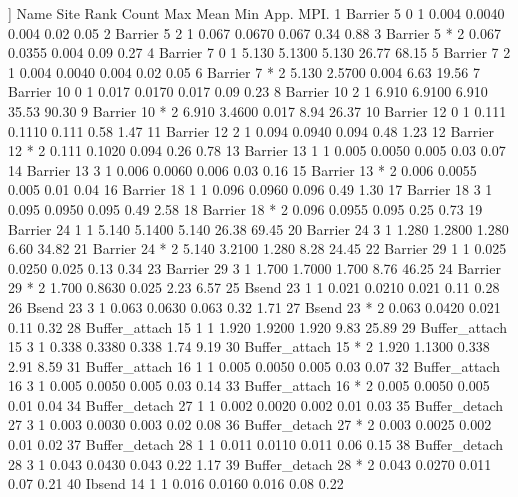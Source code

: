 \begin{Output}
[[5]]
            Name Site Rank Count   Max   Mean   Min  App.  MPI.
1        Barrier    5    0     1 0.004 0.0040 0.004  0.02  0.05
2        Barrier    5    2     1 0.067 0.0670 0.067  0.34  0.88
3        Barrier    5    *     2 0.067 0.0355 0.004  0.09  0.27
4        Barrier    7    0     1 5.130 5.1300 5.130 26.77 68.15
5        Barrier    7    2     1 0.004 0.0040 0.004  0.02  0.05
6        Barrier    7    *     2 5.130 2.5700 0.004  6.63 19.56
7        Barrier   10    0     1 0.017 0.0170 0.017  0.09  0.23
8        Barrier   10    2     1 6.910 6.9100 6.910 35.53 90.30
9        Barrier   10    *     2 6.910 3.4600 0.017  8.94 26.37
10       Barrier   12    0     1 0.111 0.1110 0.111  0.58  1.47
11       Barrier   12    2     1 0.094 0.0940 0.094  0.48  1.23
12       Barrier   12    *     2 0.111 0.1020 0.094  0.26  0.78
13       Barrier   13    1     1 0.005 0.0050 0.005  0.03  0.07
14       Barrier   13    3     1 0.006 0.0060 0.006  0.03  0.16
15       Barrier   13    *     2 0.006 0.0055 0.005  0.01  0.04
16       Barrier   18    1     1 0.096 0.0960 0.096  0.49  1.30
17       Barrier   18    3     1 0.095 0.0950 0.095  0.49  2.58
18       Barrier   18    *     2 0.096 0.0955 0.095  0.25  0.73
19       Barrier   24    1     1 5.140 5.1400 5.140 26.38 69.45
20       Barrier   24    3     1 1.280 1.2800 1.280  6.60 34.82
21       Barrier   24    *     2 5.140 3.2100 1.280  8.28 24.45
22       Barrier   29    1     1 0.025 0.0250 0.025  0.13  0.34
23       Barrier   29    3     1 1.700 1.7000 1.700  8.76 46.25
24       Barrier   29    *     2 1.700 0.8630 0.025  2.23  6.57
25         Bsend   23    1     1 0.021 0.0210 0.021  0.11  0.28
26         Bsend   23    3     1 0.063 0.0630 0.063  0.32  1.71
27         Bsend   23    *     2 0.063 0.0420 0.021  0.11  0.32
28 Buffer_attach   15    1     1 1.920 1.9200 1.920  9.83 25.89
29 Buffer_attach   15    3     1 0.338 0.3380 0.338  1.74  9.19
30 Buffer_attach   15    *     2 1.920 1.1300 0.338  2.91  8.59
31 Buffer_attach   16    1     1 0.005 0.0050 0.005  0.03  0.07
32 Buffer_attach   16    3     1 0.005 0.0050 0.005  0.03  0.14
33 Buffer_attach   16    *     2 0.005 0.0050 0.005  0.01  0.04
34 Buffer_detach   27    1     1 0.002 0.0020 0.002  0.01  0.03
35 Buffer_detach   27    3     1 0.003 0.0030 0.003  0.02  0.08
36 Buffer_detach   27    *     2 0.003 0.0025 0.002  0.01  0.02
37 Buffer_detach   28    1     1 0.011 0.0110 0.011  0.06  0.15
38 Buffer_detach   28    3     1 0.043 0.0430 0.043  0.22  1.17
39 Buffer_detach   28    *     2 0.043 0.0270 0.011  0.07  0.21
40        Ibsend   14    1     1 0.016 0.0160 0.016  0.08  0.22

\end{Output}
